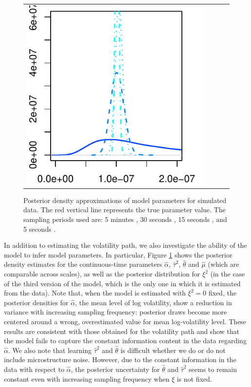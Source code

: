 \documentclass[10pt]{article}
\newcommand{\htheta}{\hat{\theta}}
\newcommand{\halpha}{\hat{\alpha}}
\newcommand{\htau}{\hat{\tau}}
\begin{document}
\begin{figure}[h!]
\begin{tabular}{m{0.25cm}ccc}
\begin{minipage}{0.20\textwidth}
				\includegraphics[width=1\linewidth]{results-simulation-10003-bid-ask-noise-plots-microstructure-XI.pdf}
				\end{minipage}
\end{tabular}
\caption{Posterior density approximations of model parameters for
  simulated data. The red vertical line represents the true parameter
  value. The sampling periods used are: 5 minutes
  \usebox{\legendLineOne}, 30 seconds \usebox{\legendLineTwo}, 15
  seconds \usebox{\legendLineThree}, and 5 seconds
  \usebox{\legendLineFour}.}  \label{fig:posterior-parameters-simulated}
\end{figure}

In addition to estimating the volatility path, we also investigate the ability of the model to infer model parameters.  In particular, Figure \ref{fig:posterior-parameters-simulated} shows the posterior density estimates for the continuous-time parameters $\hat{\alpha}$, $\hat{\tau}^2$, $\hat{\theta}$ and $\hat{\mu}$ (which are comparable across scales), as well as the posterior distribution for $\xi^2$ (in the case of the third version of the model, which is the only one in which it is estimated from the data).  Note that, when the model is estimated with $\xi^2 = 0$ fixed, the posterior densities for $\halpha$, the mean level of log volatility, show a reduction in variance with increasing sampling frequency:  posterior draws become more centered around a wrong, overestimated value for mean log-volatility level. These results are consistent with those obtained for the volatility path and show that the model fails to capture the constant information content in the data regarding $\halpha$.  We also note that learning $\htau^2$ and $\htheta$ is difficult whether we do or do not include microstructure noise. However, due to the constant information in the data with respect to $\halpha$, the posterior uncertainty for $\htheta$ and $\htau^2$ seems to remain constant even with increasing sampling frequency when $\xi$ is not fixed.
\end{document}

